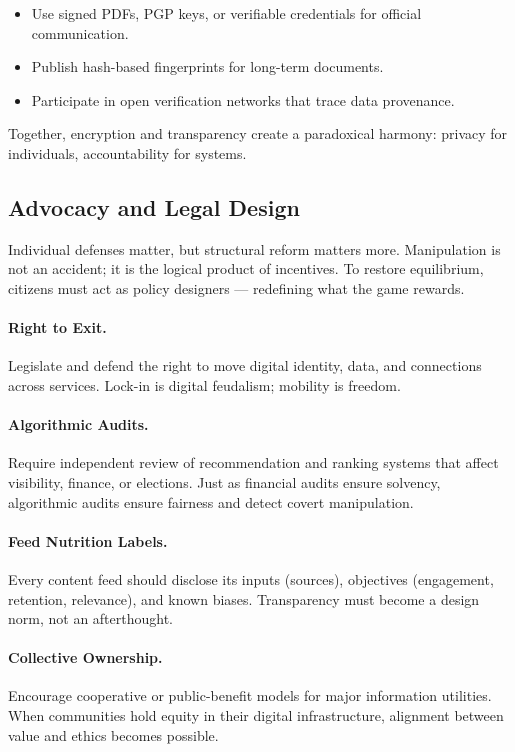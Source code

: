 \documentclass[12pt,twoside]{book}
\begin{document}
\begin{itemize}
  \item Use signed PDFs, PGP keys, or verifiable credentials for official communication.  
  \item Publish hash-based fingerprints for long-term documents.  
  \item Participate in open verification networks that trace data provenance.
\end{itemize}

Together, encryption and transparency create a paradoxical harmony: privacy for individuals, accountability for systems.

\subsection*{Advocacy and Legal Design}

Individual defenses matter, but structural reform matters more.  
Manipulation is not an accident; it is the logical product of incentives.  
To restore equilibrium, citizens must act as policy designers --- redefining what the game rewards.

\paragraph{Right to Exit.}
Legislate and defend the right to move digital identity, data, and connections across services.  
Lock-in is digital feudalism; mobility is freedom.

\paragraph{Algorithmic Audits.}
Require independent review of recommendation and ranking systems that affect visibility, finance, or elections.  
Just as financial audits ensure solvency, algorithmic audits ensure fairness and detect covert manipulation.

\paragraph{Feed Nutrition Labels.}
Every content feed should disclose its inputs (sources), objectives (engagement, retention, relevance), and known biases.  
Transparency must become a design norm, not an afterthought.

\paragraph{Collective Ownership.}
Encourage cooperative or public-benefit models for major information utilities.  
When communities hold equity in their digital infrastructure, alignment between value and ethics becomes possible.\\
\end{document}
